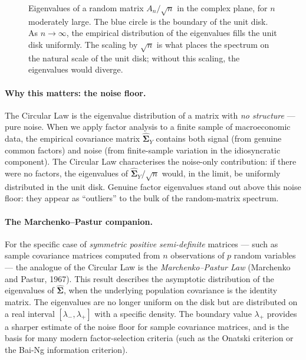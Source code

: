 \documentclass[11pt, a4paper, oneside]{article}
\begin{document}
\begin{figure}[H]
\caption{Eigenvalues of a random matrix $A_n / \sqrt{n}$ in the
complex plane, for $n$ moderately large. The blue circle is the
boundary of the unit disk. As $n \to \infty$, the empirical
distribution of the eigenvalues fills the unit disk uniformly. The
scaling by $\sqrt{n}$ is what places the spectrum on the natural
scale of the unit disk; without this scaling, the eigenvalues would
diverge.}
\label{fig:circular-law}
\end{figure}

\paragraph{Why this matters: the noise floor.}
The Circular Law is the eigenvalue distribution of a matrix with
\emph{no structure} — pure noise. When we apply factor analysis to a
finite sample of macroeconomic data, the empirical covariance matrix
$\widehat{\boldsymbol{\Sigma}}_Y$ contains both signal (from genuine
common factors) and noise (from finite-sample variation in the
idiosyncratic component). The Circular Law characterises the
noise-only contribution: if there were no factors, the eigenvalues
of $\widehat{\boldsymbol{\Sigma}}_Y / \sqrt{n}$ would, in the limit,
be uniformly distributed in the unit disk. Genuine factor
eigenvalues stand out above this noise floor: they appear as
``outliers'' to the bulk of the random-matrix spectrum.

\paragraph{The Marchenko–Pastur companion.}
For the specific case of \emph{symmetric positive semi-definite}
matrices — such as sample covariance matrices computed from $n$
observations of $p$ random variables — the analogue of the Circular
Law is the \emph{Marchenko–Pastur Law} (Marchenko and Pastur,
1967). This result describes the asymptotic distribution of the
eigenvalues of $\widehat{\boldsymbol{\Sigma}}$, when the underlying
population covariance is the identity matrix. The eigenvalues are
no longer uniform on the disk but are distributed on a real interval
$[\lambda_-, \lambda_+]$ with a specific density. The boundary value
$\lambda_+$ provides a sharper estimate of the noise floor for
sample covariance matrices, and is the basis for many modern
factor-selection criteria (such as the Onatski criterion or the
Bai-Ng information criterion).
\end{document}
